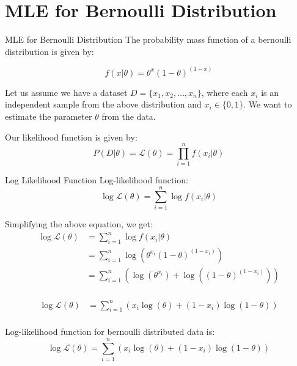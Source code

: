 \documentclass[handout]{beamer}
\begin{document}
\section{MLE for Bernoulli Distribution}
\begin{frame}{MLE for Bernoulli Distribution}
The probability mass function of a bernoulli distribution is given by:

\begin{equation}
f(x|\theta) = \theta^x(1-\theta)^{(1-x)}
\end{equation}

Let us assume we have a dataset $D = \{x_1, x_2, \ldots, x_n\}$, where each $x_i$ is an independent sample from the above distribution and $x_i\in\{0, 1\}$.
We want to estimate the parameter $\theta$ from the data.

Our likelihood function is given by:
\begin{equation}
P(D|\theta) = \mathcal{L}(\theta) = \prod_{i=1}^n f(x_i|\theta)
\end{equation}
\end{frame}

\begin{frame}{Log Likelihood Function}
    Log-likelihood function:
    \begin{equation}
        \log \mathcal{L}(\theta) = \sum_{i=1}^n \log f(x_i|\theta)
    \end{equation}

    Simplifying the above equation, we get:
    \begin{align*}
        \log \mathcal{L}(\theta) &= \sum_{i=1}^n \log f(x_i|\theta) \\
        &= \sum_{i=1}^n \log \left (\theta^{x_{i}}(1-\theta)^{(1-x_{i})} \right) \\
        &= \sum_{i=1}^n \left( \log \left( \theta^{x_{i}} \right) + \log \left( (1-\theta)^{(1-x_{i})}  \right) \right) \\
        \end{align*}
\end{frame}
\begin{frame}
   
    \begin{align*}
        \log \mathcal{L}(\theta) &= \sum_{i=1}^n \left (x_{i}\log \left( \theta \right) + (1-x_{i})\log \left(1-\theta \right) \right)\\
        \end{align*}
        \begin{tcolorbox}[colback=metropolisblue!5,colframe=metropolisblue,title=Log Likelihood Function for Bernoulli Distribution]
            Log-likelihood function for bernoulli distributed data is:
            \[
                \log \mathcal{L}(\theta) = \sum_{i=1}^n  (x_{i}\log(\theta) + (1-x_{i})\log(1-\theta))
                \]
        \end{tcolorbox}
\end{frame}
\end{document}
